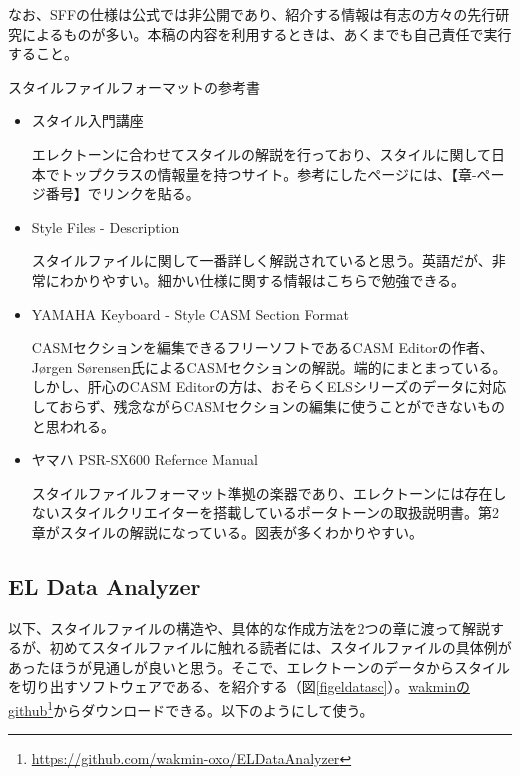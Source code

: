 \documentclass[uplatex, 10pt, dvipdfmx]{jsarticle}
\numberwithin{equation}{section}
\newcommand{\emphj}[1]{\textbf{\textrm{\textgt{{#1}}}}}
\begin{document}
なお、SFFの仕様は公式では非公開であり、紹介する情報は有志の方々の先行研究によるものが多い。本稿の内容を利用するときは、あくまでも自己責任で実行すること。
\begin{itembox}{スタイルファイルフォーマットの参考書}
\begin{itemize}
\item スタイル入門講座\cite{スタイル}

エレクトーンに合わせてスタイルの解説を行っており、スタイルに関して日本でトップクラスの情報量を持つサイト。参考にしたページには、【章-ページ番号】でリンクを貼る。

\item Style Files - Description\cite{style}

スタイルファイルに関して一番詳しく解説されていると思う。英語だが、非常にわかりやすい。細かい仕様に関する情報はこちらで勉強できる。

\item YAMAHA Keyboard - Style CASM Section Format\cite{CASMeditor}

CASMセクションを編集できるフリーソフトであるCASM Editorの作者、Jørgen Sørensen氏によるCASMセクションの解説。端的にまとまっている。しかし、肝心のCASM Editorの方は、おそらくELSシリーズのデータに対応しておらず、残念ながらCASMセクションの編集に使うことができないものと思われる。

\item ヤマハ PSR-SX600 Refernce Manual\cite{PSR}

スタイルファイルフォーマット準拠の楽器であり、エレクトーンには存在しないスタイルクリエイターを搭載しているポータトーンの取扱説明書。第2章がスタイルの解説になっている。図表が多くわかりやすい。
\end{itemize}
\end{itembox}

\subsection{EL Data Analyzer}

以下、スタイルファイルの構造や、具体的な作成方法を2つの章に渡って解説するが、初めてスタイルファイルに触れる読者には、スタイルファイルの具体例があったほうが見通しが良いと思う。そこで、エレクトーンのデータからスタイルを切り出すソフトウェアである、\emphj{EL Data Analyzer}を紹介する（図\ref{figeldatasc}）。\href{https://github.com/wakmin-oxo/ELDataAnalyzer}{wakminのgithub}\footnote{\url{https://github.com/wakmin-oxo/ELDataAnalyzer}}からダウンロードできる。以下のようにして使う。
\end{document}
